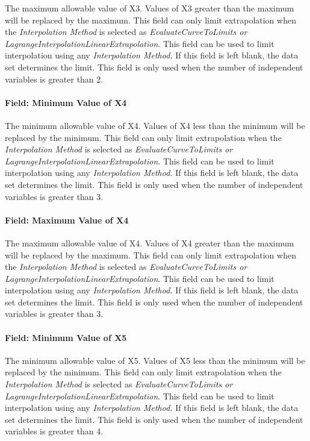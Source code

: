 The maximum allowable value of X3. Values of X3 greater than the maximum will be replaced by the maximum. This field can only limit extrapolation when the \emph{Interpolation Method} is selected as \emph{EvaluateCurveToLimits or LagrangeInterpolationLinearExtrapolation}. This field can be used to limit interpolation using any \emph{Interpolation Method.} If this field is left blank, the data set determines the limit. This field is only used when the number of independent variables is greater than 2.

\paragraph{Field: Minimum Value of X4}\label{field-minimum-value-of-x4}

The minimum allowable value of X4. Values of X4 less than the minimum will be replaced by the minimum. This field can only limit extrapolation when the \emph{Interpolation Method} is selected as \emph{EvaluateCurveToLimits or LagrangeInterpolationLinearExtrapolation}. This field can be used to limit interpolation using any \emph{Interpolation Method.} If this field is left blank, the data set determines the limit. This field is only used when the number of independent variables is greater than 3.

\paragraph{Field: Maximum Value of X4}\label{field-maximum-value-of-x4}

The maximum allowable value of X4. Values of X4 greater than the maximum will be replaced by the maximum. This field can only limit extrapolation when the \emph{Interpolation Method} is selected as \emph{EvaluateCurveToLimits or LagrangeInterpolationLinearExtrapolation}. This field can be used to limit interpolation using any \emph{Interpolation Method.} If this field is left blank, the data set determines the limit. This field is only used when the number of independent variables is greater than 3.

\paragraph{Field: Minimum Value of X5}\label{field-minimum-value-of-x5}

The minimum allowable value of X5. Values of X5 less than the minimum will be replaced by the minimum. This field can only limit extrapolation when the \emph{Interpolation Method} is selected as \emph{EvaluateCurveToLimits or LagrangeInterpolationLinearExtrapolation}. This field can be used to limit interpolation using any \emph{Interpolation Method.} If this field is left blank, the data set determines the limit. This field is only used when the number of independent variables is greater than 4.

